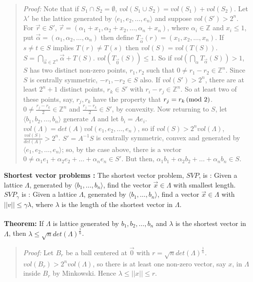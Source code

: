 \begin{quote}
\emph{Proof:}
Note that if $S_1 \cap S_2 = \emptyset$, $vol(S_1 \cup S_2) = vol(S_1) + vol(S_2)$.
Let $\lambda'$ be the lattice generated by $\langle e_1, e_2, \ldots, e_n \rangle$ and suppose $vol(S') > 2^n$.
For ${\vec r} \in S'$, ${\vec r} = (\alpha_1 + x_1, \alpha_2 + x_2, \ldots, \alpha_n + x_n)$,
where $\alpha_i \in {\mathbb Z}$ and
$x_i \leq 1$, put ${\vec \alpha} = (\alpha_1, \alpha_2, \ldots , \alpha_n)$ then
define $T_{\vec \alpha}(r) = (x_1, x_2, \ldots, x_n)$.
If $s \ne t \in S$ implies $T(r) \ne T(s)$ then
$vol(S) = vol(T(S))$. $S = \bigcap_{{\vec \alpha} \in {\mathbb Z}^n} {\vec \alpha} + T(S)$.
$vol(T_{\vec 0}(S)) \leq 1$.   So if $vol(\bigcap_{\alpha}T_{\vec \alpha}(S)) > 1$,
$S$ has two distinct non-zero
points, $r_1, r_2$ such that $0 \ne r_1 - r_2 \in {\mathbb Z}^n$. Since $S$ is centrally symmetric, $-r_1, -r_2 \in S$
also.  
If $vol(S') > 2^n$, there are at least $2^n +1$ distinct points, $r_k \in S'$ with $r_i - r_j \in {\mathbb Z}^n$.
So at least two of these points, say, $r_j, r_k$ have the property that $r_j = r_k \thinspace \textnormal{(mod } 2 \textnormal{)}$.
$0 \ne {\frac {r_j - r_k} {2}} \in {\mathbb Z}^n$ and ${\frac {r_j - r_k} {2}} \in S'$, by convexity.
Now returning to $S$, let $\langle b_1, b_2, \ldots, b_n \rangle$ generate $\Lambda$ and let
$b_i = A e_i$. $vol(\Lambda) = det(A) vol(e_1, e_2, \ldots, e_n)$, so if $vol(S) > 2^n vol(\Lambda)$,
${\frac {vol(S)} {det(A)}} > 2^n$.  $S' = A^{-1}S$ is centrally symmetric, convex and
generated by $\langle e_1, e_2, \ldots, e_n \rangle$; so, by the case above, there is a vector
$0 \ne \alpha_1 e_1 +\alpha_2 e_2 + \ldots  +\alpha_n e_n \in S'$.  But then,
$\alpha_1 b_1 +\alpha_2 b_2 + \ldots  +\alpha_n b_n \in S$.
\end{quote}
{\bf Shortest vector problems :}  The shortest vector problem, $SVP$, is :
Given a lattice $\Lambda$, generated by $\langle b_1 , \ldots , b_n \rangle$,
find the vector ${\vec x} \in \Lambda$ with smallest length.
$SVP_{\gamma}$ is :
Given a lattice $\Lambda$, generated by $\langle b_1 , \ldots , b_n \rangle$,
find a vector ${\vec x} \in \Lambda$ with $||v|| \leq \gamma \lambda$, where $\lambda$ is the length of the
shortest vector in $\Lambda$.
\\
\\
{\bf Theorem: } If $\Lambda$ is lattice generated by $b_1, b_2, \ldots, b_n$ and $\lambda$ is the shortest vector
in $\Lambda$, then $\lambda \leq \sqrt{n} det(\Lambda)^{\frac 1 n}$.
\begin{quote}
\emph{Proof:}
Let $B_r$ be a ball centered at ${\vec 0}$ with $r = \sqrt{n}det(\Lambda)^{\frac 1 n}$.
$vol(B_r) > 2^n vol(\Lambda)$, so there is at least one non-zero vector, say $x$, in $\Lambda$ inside $B_r$
by Minkowski. Hence $\lambda \leq ||x|| \leq r$.
\end{quote}
